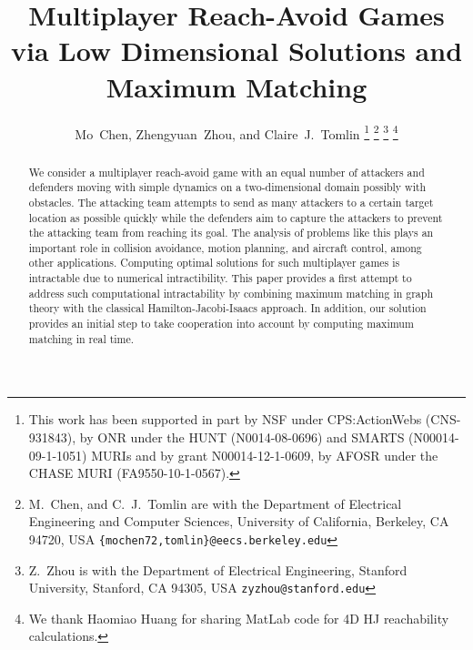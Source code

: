 \documentclass[letterpaper, 10 pt, conference]{ieeeconf}  %
\title{\LARGE \bf
Multiplayer Reach-Avoid Games via Low Dimensional Solutions and Maximum Matching
}
\author{Mo~Chen, Zhengyuan~Zhou, and Claire~J.~Tomlin%
\thanks{This work has been supported in part by NSF under CPS:ActionWebs (CNS-931843), by ONR under the HUNT (N0014-08-0696) and SMARTS (N00014-09-1-1051) MURIs and by grant N00014-12-1-0609, by AFOSR under the CHASE MURI (FA9550-10-1-0567).}%
\thanks{M.~Chen, and C.~J.~Tomlin are with the Department of Electrical Engineering and Computer Sciences,
        University of California, Berkeley, CA 94720, USA
        {\tt\small \{mochen72,tomlin\}@eecs.berkeley.edu}}
\thanks{Z.~Zhou is with the Department of Electrical Engineering,
        Stanford University, Stanford, CA 94305, USA
        {\tt\small zyzhou@stanford.edu}}   
\thanks{We thank Haomiao Huang for sharing MatLab code for 4D HJ reachability calculations.}
}
\numberwithin{algorithm}{section}
\begin{document}
\maketitle

\thispagestyle{empty}
\pagestyle{empty}

\begin{abstract}
We consider a multiplayer reach-avoid game with an equal number of attackers and defenders moving with simple dynamics on a two-dimensional domain possibly with obstacles. The attacking team attempts to send as many attackers to a certain target location as possible quickly while the defenders aim to capture the attackers to prevent the attacking team from reaching its goal.  The analysis of problems like this plays an important role in collision avoidance, motion planning, and aircraft control, among other applications. Computing optimal solutions for such multiplayer games is intractable due to numerical intractibility. This paper provides a first attempt to address such computational intractability by combining maximum matching in graph theory with the classical Hamilton-Jacobi-Isaacs approach. In addition, our solution provides an initial step to take cooperation into account by computing maximum matching in real time.
\end{abstract}









\end{document}
